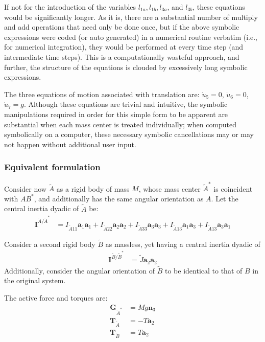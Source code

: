 \documentclass[letterpaper,11pt]{article}
\newcommand{\bs}[1]{ \boldsymbol{ #1 } }
\begin{document}
If not for the introduction of the variables $l_{1a}, l_{1b}, l_{3a}$, and
$l_{3b}$, these equations would be significantly longer. As it is, there are a
substantial number of multiply and add operations that need only be done once,
but if the above symbolic expressions were coded (or auto generated) in a
numerical routine verbatim (i.e., for numerical integration), they would be
performed at every time step (and intermediate time steps).  This is a
computationally wasteful approach, and further, the structure of the equations
is clouded by excessively long symbolic expressions.

The three equations of motion associated with translation are:
$\dot{u}_5 = 0$, $\dot{u}_6 = 0$, $\dot{u}_7 = g$.  Although these equations
are trivial and intuitive, the symbolic manipulations required in order for
this simple form to be apparent are substantial when each mass center is treated
individually; when computed symbolically on a computer, these necessary
symbolic cancellations may or may not happen without additional user input.

\subsubsection*{Equivalent formulation}
Consider now $\tilde{A}$ as a rigid body of mass $M$, whose mass center
$\tilde{A}^*$ is coincident with $AB^*$, and additionally has the same angular
orientation as $A$.
Let the central inertia dyadic of $\tilde{A}$ be:
\begin{align*}
  \bs{I}^{\tilde{A}/\tilde{A}^*} & = I_{\tilde{A}11}\bs{a}_1\bs{a}_1 + I_{\tilde{A}22}\bs{a}_2\bs{a}_2 +
  I_{\tilde{A}33}\bs{a}_3\bs{a}_3 + I_{\tilde{A}13}\bs{a}_1\bs{a}_3 + I_{\tilde{A}13}\bs{a}_3\bs{a}_1
\end{align*}

Consider a second rigid body $\tilde{B}$ as massless, yet having a central inertia
dyadic of
\begin{align*}
  \bs{I}^{\tilde{B}/\tilde{B}^*} & = \tilde{J}\bs{a}_2\bs{a}_2
\end{align*}
Additionally, consider the angular orientation of $\tilde{B}$ to be identical
to that of $B$ in the original system.

The active force and torques are:
\begin{align*}
  \bs{G}_{\tilde{A}^*} & = Mg\bs{n}_3 \\
  \bs{T}_{\tilde{A}} & = - T \bs{a}_2 \\
  \bs{T}_{\tilde{B}} & = T \bs{a}_2
\end{align*}
\end{document}
